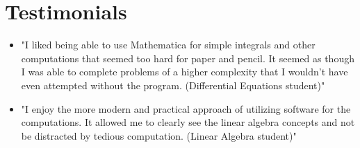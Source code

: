 \documentclass[11pt]{article}
\begin{document}
\section{Testimonials}
\begin{itemize}[leftmargin=*]
  \item "I liked being able to use Mathematica for simple integrals and other computations that seemed too hard for paper and pencil. It seemed as though I was able to complete problems of a higher complexity that I wouldn't have even attempted without the program. (Differential Equations student)"
  \item "I enjoy the more modern and practical approach of utilizing software for the computations. It allowed me to clearly see the linear algebra concepts and not be distracted by tedious computation. (Linear Algebra student)"
\end{itemize}
\end{document}
